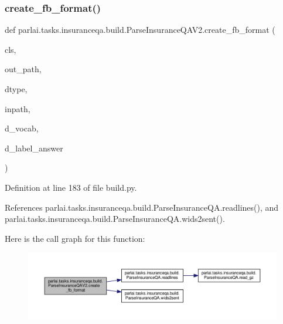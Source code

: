 \subsubsection{\texorpdfstring{create\+\_\+fb\+\_\+format()}{create\_fb\_format()}}
{\footnotesize\ttfamily def parlai.\+tasks.\+insuranceqa.\+build.\+Parse\+Insurance\+Q\+A\+V2.\+create\+\_\+fb\+\_\+format (\begin{DoxyParamCaption}\item[{}]{cls,  }\item[{}]{out\+\_\+path,  }\item[{}]{dtype,  }\item[{}]{inpath,  }\item[{}]{d\+\_\+vocab,  }\item[{}]{d\+\_\+label\+\_\+answer }\end{DoxyParamCaption})}



Definition at line 183 of file build.\+py.



References parlai.\+tasks.\+insuranceqa.\+build.\+Parse\+Insurance\+Q\+A.\+readlines(), and parlai.\+tasks.\+insuranceqa.\+build.\+Parse\+Insurance\+Q\+A.\+wids2sent().

Here is the call graph for this function\+:
\nopagebreak
\begin{figure}[H]
\begin{center}
\leavevmode
\includegraphics[width=350pt]{classparlai_1_1tasks_1_1insuranceqa_1_1build_1_1ParseInsuranceQAV2_abaa749229881633590c411cdaf79c6ff_cgraph}
\end{center}
\end{figure}
\mbox{\label{classparlai_1_1tasks_1_1insuranceqa_1_1build_1_1ParseInsuranceQAV2_a8a510d31a4f0b733beb887de3c8379b0}} 
